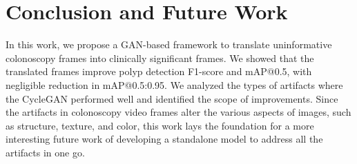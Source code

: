 \documentclass[letterpaper]{article} %
\begin{document}
\begin{table}

    \centering
    \large


     \caption{Comparative analysis of polyp detection results}
     \label{tab:localization}
\end{table}







\section{Conclusion and Future Work}
In this work, we propose a GAN-based framework to translate uninformative colonoscopy frames into clinically significant frames. We showed that the translated frames improve polyp detection F1-score and mAP@0.5, with negligible reduction in mAP@0.5:0.95. We analyzed the types of artifacts where the CycleGAN performed well and identified the scope of improvements. Since the artifacts in colonoscopy video frames alter the various aspects of images, such as structure, texture, and color, this work lays the foundation for a more interesting future work of developing a standalone model to address all the artifacts in one go.
\end{document}
